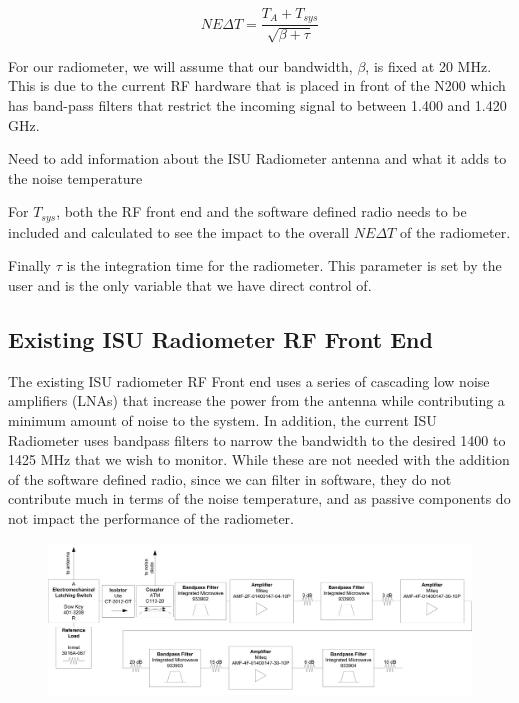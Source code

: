 \begin{equation}
NE\Delta T=\frac{T_{A}+T_{sys}}{\sqrt{\beta + \tau}}
\end{equation}

For our radiometer, we will assume that our bandwidth, $\beta$, is fixed at 20 MHz.  This is due to the current RF hardware that is placed in front of the N200 which has band-pass filters that restrict the incoming signal to between 1.400 and 1.420 GHz. 

Need to add information about the ISU Radiometer antenna and what it adds to the noise temperature

For $T_{sys}$, both the RF front end and the software defined radio needs to be included and calculated to see the impact to the overall $NE\Delta T$ of the radiometer.  

Finally $\tau$ is the integration time for the radiometer.  This parameter is set by the user and is the only variable that we have direct control of.  

\subsection{Existing ISU Radiometer RF Front End}

The existing ISU radiometer RF Front end uses a series of cascading low noise amplifiers (LNAs) that increase the power from the antenna while contributing a minimum amount of noise to the system.  In addition, the current ISU Radiometer uses bandpass filters to narrow the bandwidth to the desired 1400 to 1425 MHz that we wish to monitor.  While these are not needed with the addition of the software defined radio, since we can filter in software, they do not contribute much in terms of the noise temperature, and as passive components do not impact the performance of the radiometer.

{\begin{figure}[h!tb] 
\centering
\includegraphics[width=17cm]{Images/ISU_rf_block.png}
\label{ISU_rf_block}
\end{figure}
}


